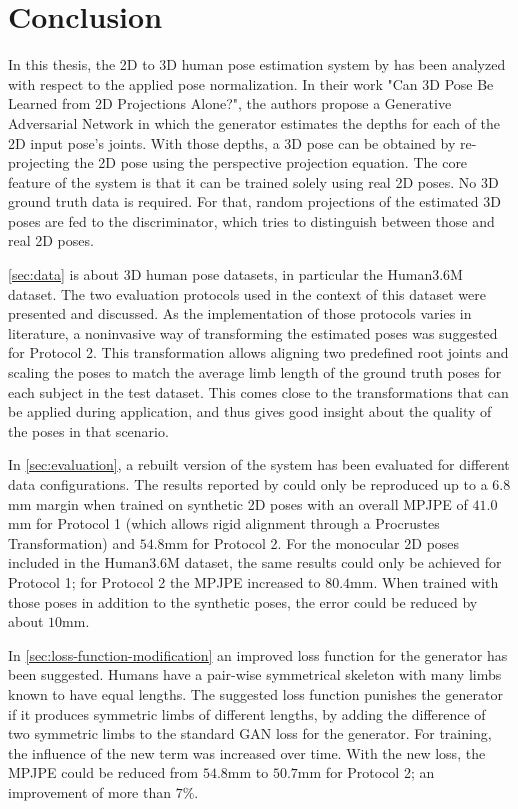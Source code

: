 \section{Conclusion}
\label{sec:conclusion}
In this thesis, the 2D to 3D human pose estimation system by \citet{drover18} has been analyzed with respect to the applied pose normalization.
In their work "Can 3D Pose Be Learned from 2D Projections Alone?", the authors propose a Generative Adversarial Network in which the generator estimates the depths for each of the 2D input pose's joints.
With those depths, a 3D pose can be obtained by re-projecting the 2D pose using the perspective projection equation.
The core feature of the system is that it can be trained solely using real 2D poses.
No 3D ground truth data is required.
For that, random projections of the estimated 3D poses are fed to the discriminator, which tries to distinguish between those and real 2D poses.

\autoref{sec:data} is about 3D human pose datasets, in particular the Human3.6M \cite{ionescu14} dataset.
The two evaluation protocols used in the context of this dataset were presented and discussed.
As the implementation of those protocols varies in literature, a noninvasive way of transforming the estimated poses was suggested for Protocol 2.
This transformation allows aligning two predefined root joints and scaling the poses to match the average limb length of the ground truth poses for each subject in the test dataset.
This comes close to the transformations that can be applied during application, and thus gives good insight about the quality of the poses in that scenario.

In \autoref{sec:evaluation}, a rebuilt version of the system has been evaluated for different data configurations.
The results reported by \citet{drover18} could only be reproduced up to a $6.8$mm margin when trained on synthetic 2D poses with an overall MPJPE of $41.0$mm for Protocol 1 (which allows rigid alignment through a Procrustes Transformation) and $54.8$mm for Protocol 2.
For the monocular 2D poses included in the Human3.6M dataset, the same results could only be achieved for Protocol 1; for Protocol 2 the MPJPE increased to $80.4$mm.
When trained with those poses in addition to the synthetic poses, the error could be reduced by about $10$mm.

In \autoref{sec:loss-function-modification} an improved loss function for the generator has been suggested.
Humans have a pair-wise symmetrical skeleton with many limbs known to have equal lengths.
The suggested loss function punishes the generator if it produces symmetric limbs of different lengths, by adding the difference of two symmetric limbs to the standard GAN loss for the generator.
For training, the influence of the new term was increased over time.
With the new loss, the MPJPE could be reduced from $54.8$mm to $50.7$mm for Protocol 2; an improvement of more than $7\%$.

